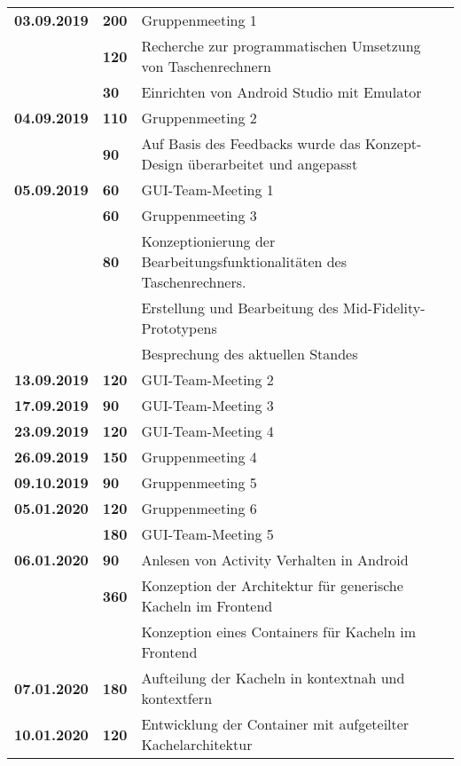 {{\begin{longtable}{|l|l|p{11cm}|}
		\textbf{03.09.2019} 
			& \textbf{\hfill 200} & Gruppenmeeting 1 \\\cline{2-3}
			& \textbf{\hfill 120} & Recherche zur programmatischen Umsetzung von Taschenrechnern \\\cline{2-3}
			& \textbf{\hfill 30} & Einrichten von Android Studio mit Emulator
		\\	
		\hline \textbf{04.09.2019}
			& \textbf{\hfill 110} & Gruppenmeeting 2 \\\cline{2-3}
			& \textbf{\hfill 90} & Auf Basis des Feedbacks wurde das Konzept-Design überarbeitet und angepasst
		\\	
		\hline \textbf{05.09.2019}
			& \textbf{\hfill 60} & GUI-Team-Meeting 1 \\\cline{2-3}
			& \textbf{\hfill 60} & Gruppenmeeting 3 \\
			& \textbf{\hfill 80} & Konzeptionierung der Bearbeitungsfunktionalitäten des Taschenrechners. \\
			& & Erstellung und Bearbeitung des Mid-Fidelity-Prototypens \\
			& & Besprechung des aktuellen Standes
		\\	
		\hline \textbf{13.09.2019}
			& \textbf{\hfill 120} & GUI-Team-Meeting 2
		\\	
		\hline \textbf{17.09.2019}
			& \textbf{\hfill 90} & GUI-Team-Meeting 3
		\\	
		\hline \textbf{23.09.2019}
			& \textbf{\hfill 120} & GUI-Team-Meeting 4
		\\	
		\hline \textbf{26.09.2019}
			& \textbf{\hfill 150} & Gruppenmeeting 4
		\\			
		\hline \textbf{09.10.2019}
			& \textbf{\hfill 90} & Gruppenmeeting 5
		\\	
		\hline \textbf{05.01.2020}
			& \textbf{\hfill 120} & Gruppenmeeting 6 \\\cline{2-3}
			& \textbf{\hfill 180} & GUI-Team-Meeting 5
		\\	
		\hline \textbf{06.01.2020}
			& \textbf{\hfill 90} & Anlesen von Activity Verhalten in Android \\\cline{2-3}
			& \textbf{\hfill 360} & Konzeption der Architektur für generische Kacheln im Frontend \\
			& & Konzeption eines Containers für Kacheln im Frontend
		\\	
		\hline \textbf{07.01.2020}
			& \textbf{\hfill 180} & Aufteilung der Kacheln in kontextnah und kontextfern
		\\	
		\hline \textbf{10.01.2020}
			& \textbf{\hfill 120} & Entwicklung der Container mit aufgeteilter Kachelarchitektur \\

\end{longtable}}}
